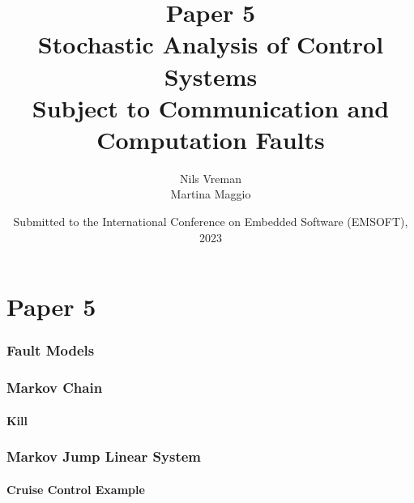 \section{Paper 5}

\title[PhD Defence]{
    {\Huge Paper 5} \\
    \vspace{2mm}
    {\Large Stochastic Analysis of Control Systems}\\
    {\Large Subject to Communication and Computation Faults}
}
\author[Nils Vreman]{
    Nils Vreman \\
    \vspace{3mm}
    {\large Martina Maggio}
}
\date[EMSOFT 2023]{
    Submitted to the International Conference on Embedded Software (EMSOFT), 2023\\
}
\notitlelogo
{}


\begin{frame}
    \frametitle{Fault Models}
    \begin{figure}
        \centering
        \only<2>{}%
        \only<3>{}%
    \end{figure}
\end{frame}

\begin{frame}
    \frametitle{Markov Chain}%
    \framesubtitle{Kill}%
    \vspace{-2em}
    \begin{figure}
        \centering
        \only<2>{}%
        \only<3>{}%
    \end{figure}
\end{frame}

\begin{frame}
    \frametitle{Markov Jump Linear System}%
    \framesubtitle{Cruise Control Example}
    \begin{figure}
        \centering
    \end{figure}
\end{frame}
